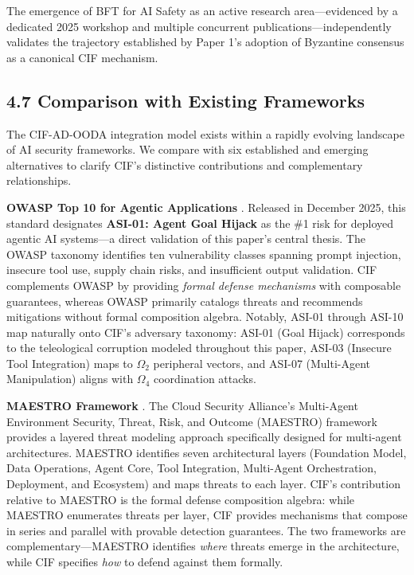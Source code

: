 \documentclass[
]{article}
\begin{document}
The emergence of BFT for AI Safety as an active research
area---evidenced by a dedicated 2025 workshop and multiple concurrent
publications---independently validates the trajectory established by
Paper 1's adoption of Byzantine consensus as a canonical CIF mechanism.

\subsection{4.7 Comparison with Existing
Frameworks}\label{comparison-with-existing-frameworks}

The CIF-AD-OODA integration model exists within a rapidly evolving
landscape of AI security frameworks. We compare with six established and
emerging alternatives to clarify CIF's distinctive contributions and
complementary relationships.

\textbf{OWASP Top 10 for Agentic Applications} \cite{owasp2025agentic}.
Released in December 2025, this standard designates \textbf{ASI-01:
Agent Goal Hijack} as the \#1 risk for deployed agentic AI systems---a
direct validation of this paper's central thesis. The OWASP taxonomy
identifies ten vulnerability classes spanning prompt injection, insecure
tool use, supply chain risks, and insufficient output validation. CIF
complements OWASP by providing \emph{formal defense mechanisms} with
composable guarantees, whereas OWASP primarily catalogs threats and
recommends mitigations without formal composition algebra. Notably,
ASI-01 through ASI-10 map naturally onto CIF's adversary taxonomy:
ASI-01 (Goal Hijack) corresponds to the teleological corruption modeled
throughout this paper, ASI-03 (Insecure Tool Integration) maps to
\(\Omega_2\) peripheral vectors, and ASI-07 (Multi-Agent Manipulation)
aligns with \(\Omega_4\) coordination attacks.

\textbf{MAESTRO Framework} \cite{csa2025maestro}. The Cloud Security
Alliance's Multi-Agent Environment Security, Threat, Risk, and Outcome
(MAESTRO) framework provides a layered threat modeling approach
specifically designed for multi-agent architectures. MAESTRO identifies
seven architectural layers (Foundation Model, Data Operations, Agent
Core, Tool Integration, Multi-Agent Orchestration, Deployment, and
Ecosystem) and maps threats to each layer. CIF's contribution relative
to MAESTRO is the formal defense composition algebra: while MAESTRO
enumerates threats per layer, CIF provides mechanisms that compose in
series and parallel with provable detection guarantees. The two
frameworks are complementary---MAESTRO identifies \emph{where} threats
emerge in the architecture, while CIF specifies \emph{how} to defend
against them formally.
\end{document}
